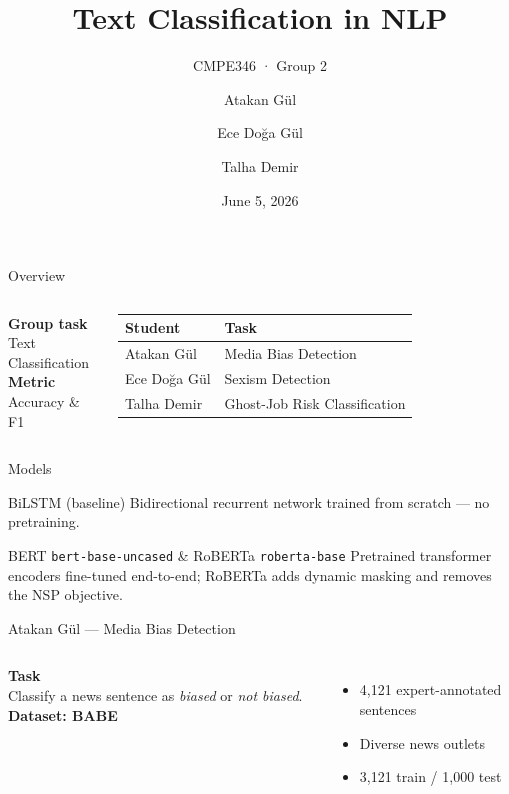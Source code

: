 \documentclass[aspectratio=169]{beamer}
\title{Text Classification in NLP}
\subtitle{CMPE346 · Group 2}
\author{Atakan Gül \and Ece Doğa Gül \and Talha Demir}
\date{June 5, 2026}
\begin{document}
\begin{frame}
\titlepage
\end{frame}

\begin{frame}{Overview}
\begin{columns}[t]
\textbf{Group task}\\[0.3cm]
Text Classification\\[0.5cm]
\textbf{Metric}\\[0.3cm]
Accuracy \& F1
\begin{tabular}{ll}
\toprule
\textbf{Student} & \textbf{Task} \\
\midrule
Atakan Gül    & Media Bias Detection \\
Ece Doğa Gül & Sexism Detection \\
Talha Demir & Ghost-Job Risk Classification \\
\bottomrule
\end{tabular}
\end{columns}
\end{frame}

\begin{frame}{Models}
\begin{block}{BiLSTM \textnormal{\small(baseline)}}
Bidirectional recurrent network trained from scratch — no pretraining.
\end{block}
\vspace{0.2cm}
\begin{block}{BERT \texttt{\small bert-base-uncased} \quad \& \quad RoBERTa \texttt{\small roberta-base}}
Pretrained transformer encoders fine-tuned end-to-end; RoBERTa adds dynamic masking and removes the NSP objective.
\end{block}
\end{frame}


\begin{frame}{Atakan Gül — Media Bias Detection}
\begin{columns}[t]
\textbf{Task}\\[0.2cm]
Classify a news sentence as \textit{biased} or \textit{not biased}.
\textbf{Dataset: BABE}\\[0.2cm]
\begin{itemize}
    \item 4,121 expert-annotated sentences
    \item Diverse news outlets
    \item 3,121 train / 1,000 test
\end{itemize}
\end{columns}
\end{frame}
\end{document}
